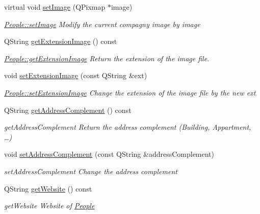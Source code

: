 \begin{DoxyCompactItemize}
virtual void \hyperlink{classModels_1_1People_a020ff3cb4cd47b7a34359fb681afe530}{set\-Image} (Q\-Pixmap $\ast$image)
\begin{DoxyCompactList}\small\item\em \hyperlink{classModels_1_1People_a020ff3cb4cd47b7a34359fb681afe530}{People\-::set\-Image} Modify the current compagny image by {\itshape image} \end{DoxyCompactList}\item 
Q\-String \hyperlink{classModels_1_1People_af5400c0b192a41310f6e7d641dbd253c}{get\-Extension\-Image} () const 
\begin{DoxyCompactList}\small\item\em \hyperlink{classModels_1_1People_af5400c0b192a41310f6e7d641dbd253c}{People\-::get\-Extension\-Image} Return the extension of the image file. \end{DoxyCompactList}\item 
void \hyperlink{classModels_1_1People_af410d9694818bc89bf1e63cd1bb57753}{set\-Extension\-Image} (const Q\-String \&ext)
\begin{DoxyCompactList}\small\item\em \hyperlink{classModels_1_1People_af410d9694818bc89bf1e63cd1bb57753}{People\-::set\-Extension\-Image} Change the extension of the image file by the new {\itshape ext} \end{DoxyCompactList}\item 
Q\-String \hyperlink{classModels_1_1People_ac57d89dcc2a06aabdfb37694183d68f0}{get\-Address\-Complement} () const 
\begin{DoxyCompactList}\small\item\em get\-Address\-Complement Return the address complement (Building, Appartment, …) \end{DoxyCompactList}\item 
void \hyperlink{classModels_1_1People_ad8dd15780dad1af2ab2a436bab8c4b58}{set\-Address\-Complement} (const Q\-String \&address\-Complement)
\begin{DoxyCompactList}\small\item\em set\-Address\-Complement Change the address complement \end{DoxyCompactList}\item 
Q\-String \hyperlink{classModels_1_1People_a898d32c40d89376bd7e8373e2f07a056}{get\-Website} () const 
\begin{DoxyCompactList}\small\item\em get\-Website Website of \hyperlink{classModels_1_1People}{People} \end{DoxyCompactList}\item 

\end{DoxyCompactItemize}
